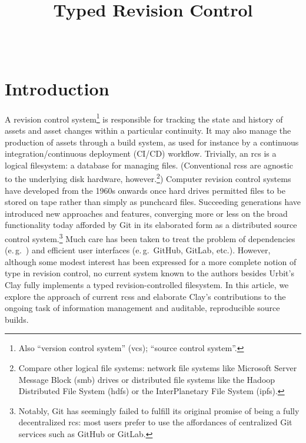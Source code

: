 \documentclass[twoside]{article}
\title{Typed Revision Control}
\author{\authorname~\authorpatp \\ \affiliation}
\date{}
\begin{document}
\maketitle
\thispagestyle{firststyle}

\begin{abstract}
  
\end{abstract}

\setcounter{page}{35}

\tableofcontents

\section{Introduction}

A revision control system\footnote{Also “version control system” ({\sc vcs}); “source control system”.} is responsible for tracking the state and history of assets and asset changes within a particular continuity.  It may also manage the production of assets through a build system, as used for instance by a continuous integration/continuous deployment (CI/CD) workflow.  Trivially, an {\sc rcs} is a logical filesystem:  a database for managing files.  (Conventional {\sc rcs}s are agnostic to the underlying disk hardware, however.\footnote{Compare other logical file systems:  network file systems like Microsoft Server Message Block ({\sc smb}) drives or distributed file systems like the Hadoop Distributed File System ({\sc hdfs}) or the InterPlanetary File System ({\sc ipfs}).})  Computer revision control systems have developed from the 1960s onwards once hard drives permitted files to be stored on tape rather than simply as punchcard files.  Succeeding generations have introduced new approaches and features, converging more or less on the broad functionality today afforded by Git \citep{Torvalds2005} in its elaborated form as a distributed source control system.\footnote{Notably, Git has seemingly failed to fulfill its original promise of being a fully decentralized {\sc rcs}:  most users prefer to use the affordances of centralized Git services such as GitHub or GitLab.}  Much care has been taken to treat the problem of dependencies (e.\,g.\ \citet{Ball2015}) and efficient user interfaces (e.\,g.\ GitHub, GitLab, etc.).  However, although some modest interest has been expressed for a more complete notion of type in revision control, no current system known to the authors besides Urbit's Clay fully implements a typed revision-controlled filesystem.  In this article, we explore the approach of current {\sc rcs}s and elaborate Clay's contributions to the ongoing task of information management and auditable, reproducible source builds.
\end{document}
